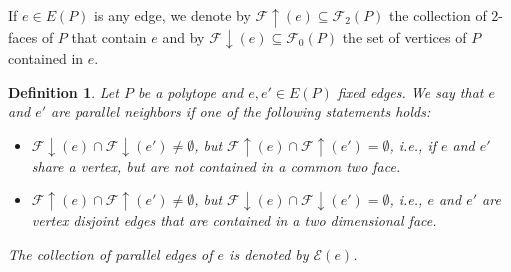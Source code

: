 \documentclass[11pt,a4paper]{amsart}
\newtheorem{definition}[theorem]{Definition}
\begin{document}
If $e\in E(P)$ is any edge, we denote by $\mathcal{F}\uparrow(e)\subseteq\mathcal{F}_2(P)$ the collection of $2$-faces of $P$ that contain $e$ and by $\mathcal{F}\downarrow(e)\subseteq\mathcal{F}_0(P)$ the set of vertices of $P$ contained in $e$.

\begin{definition}\label{def:parallel-neighbors}
    Let $P$ be a polytope and $e, e'\in E(P)$ fixed edges. We say that $e$ and $e'$ are {\normalfont parallel neighbors} if one of the following statements holds:
    \begin{itemize}
        \item[\textit{i)}] $\mathcal{F}\downarrow(e) \cap \mathcal{F}\downarrow(e')\not= \emptyset $, but $\mathcal{F}\uparrow(e) \cap \mathcal{F}\uparrow(e')= \emptyset$, i.e., if $e$ and $e'$ share a vertex, but are not contained in a common two face. 

        \item[\textit{ii)}] $\mathcal{F}\uparrow(e) \cap \mathcal{F}\uparrow(e') \not= \emptyset$, but $\mathcal{F}\downarrow(e)\cap \mathcal{F}\downarrow(e')= \emptyset$, i.e., $e$ and $e'$ are vertex disjoint edges that are contained in a two dimensional face. 
    \end{itemize}
    The collection of parallel edges of $e$ is denoted by $\mathcal{E}(e)$.
\end{definition}
\end{document}
